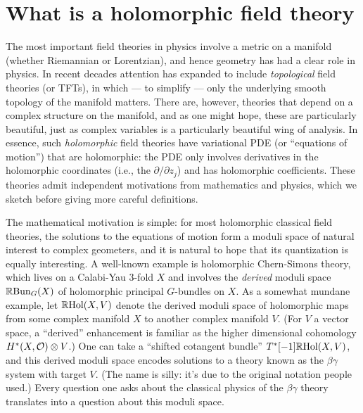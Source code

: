 \documentclass[11pt]{amsart}
\author{Owen Gwilliam and Brian R. Williams}
\date{\today}
\begin{document}






\section{What is a holomorphic field theory}

The most important field theories in physics involve a metric on a manifold (whether Riemannian or Lorentzian), and hence geometry has had a clear role in physics.
In recent decades attention has expanded to include {\em topological} field theories (or TFTs), 
in which --- to simplify --- only the underlying smooth topology of the manifold matters.
There are, however, theories that depend on a complex structure on the manifold,
and as one might hope, these are particularly beautiful, 
just as complex variables is a particularly beautiful wing of analysis.
In essence, such {\em holomorphic} field theories have variational PDE (or ``equations of motion'') that are holomorphic:
the PDE only involves derivatives in the holomorphic coordinates (i.e., the $\partial/\partial z_j$) and has holomorphic coefficients.
These theories admit independent motivations from mathematics and physics,
which we sketch before giving more careful definitions.

The mathematical motivation is simple:
for most holomorphic classical field theories, the solutions to the equations of motion form a moduli space of natural interest to complex geometers,
and it is natural to hope that its quantization is equally interesting.
A well-known example is holomorphic Chern-Simons theory,
which lives on a Calabi-Yau 3-fold $X$ and involves the {\em derived} moduli space $\mathbb R{\rm Bun}_G(X)$ of holomorphic principal $G$-bundles on $X$.
As a somewhat mundane example, let $\mathbb R{\rm Hol}(X,V)$ denote the derived moduli space of holomorphic maps from some complex manifold $X$ to another complex manifold $V$.
(For $V$ a vector space, a ``derived'' enhancement is familiar as the higher dimensional cohomology $H^*(X, \mathcal O) \otimes V$.)
One can take a ``shifted cotangent bundle'' $T^*[-1] \mathbb R{\rm Hol}(X,V)$,
and this derived moduli space encodes solutions to
a theory known as the $\beta\gamma$ system with target $V$.
(The name is silly: it's due to the original notation people used.)
Every question one asks about the classical physics of the $\beta\gamma$ theory translates into a question about this moduli space.
\end{document}
